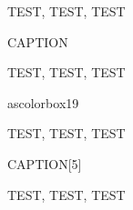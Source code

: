 \begin{ascolorbox18}{}

TEST, TEST, TEST

\end{ascolorbox18}

\begin{ascolorbox19}{CAPTION}

TEST, TEST, TEST

ascolorbox19

\end{ascolorbox19}

\begin{ascolorbox19}{}

TEST, TEST, TEST

\end{ascolorbox19}

\begin{ascolorbox19}{CAPTION}[5]

TEST, TEST, TEST

\end{ascolorbox19}

